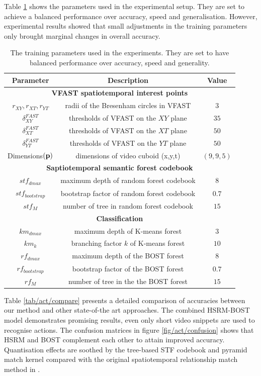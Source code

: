 Table \ref{tab/act/exparam} shows the parameters used in the experimental setup. They are set to achieve a balanced performance over accuracy, speed and generalisation. However, experimental results showed that small adjustments in the training parameters only brought marginal changes in overall accuracy. 
\begin{table}
\centering
\begin{tabular}{|c|c|c|}
\hline
\textbf{Parameter} & \textbf{Description} & \textbf{Value} \\
\hline
\multicolumn{3}{|c|}{\textbf{VFAST spatiotemporal interest points}}\\
\hline
$r_{XY}, r_{XT}, r_{YT}$ & radii of the Bresenham circles in VFAST & $3$ \\
$\delta^{FAST}_{XY}$ & thresholds of VFAST on the $XY$ plane& $35$\\
$\delta^{FAST}_{XT}$ & thresholds of VFAST on the $XT$ plane& $50$\\
$\delta^{FAST}_{YT}$ & thresholds of VFAST on the $YT$ plane& $50$\\
Dimensions$(\mathbf{p})$ & dimensions of video cuboid (x,y,t)& $(9,9,5)$ \\
\hline
\multicolumn{3}{|c|}{\textbf{Saptiotemporal semantic forest codebook}}\\
\hline
$stf_{dmax}$ & maximum depth of random forest codebook & $8$ \\
$stf_{bootstrap}$ & bootstrap factor of random forest codebook & $0.7$ \\
$stf_M$ & number of tree in random forest codebook & $15$ \\
\hline
\multicolumn{3}{|c|}{\textbf{Classification}} \\
\hline
$km_{dmax}$ & maximum depth of K-means forest & $3$ \\
$km_k$ & branching factor $k$ of K-means forest & $10$ \\
$rf_{dmax}$ & maximum depth of the BOST forest & $8$ \\
$rf_{bootstrap}$ & bootstrap factor of the BOST forest& $0.7$ \\
$rf_M$ & number of tree in the the BOST forest& $15$ \\ 
\hline
\end{tabular}
\caption{The training parameters used in the experiments. They are set to have balanced performance over accuracy, speed and generality.}
\label{tab/act/exparam}
\end{table}


Table \ref{tab/act/compare} presents a detailed comparison of accuracies between our method and other state-of-the art approaches. The combined HSRM-BOST model demonstrates promising results, even only short video snippets are used to recognise actions. 
The confusion matrices in figure \ref{fig/act/confusion} shows that HSRM and BOST complement each other to attain improved accuracy. 
Quantisation effects are soothed by the tree-based STF codebook and pyramid match kernel compared with the original spatiotemporal relationship match method in \cite{Ryoo2009}.

